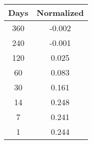 \begin{tabular}{||c c||}
\hline
Days & Normalized \\
\hline\hline
360 & -0.002 \\
240 & -0.001 \\
120 & 0.025 \\
60 & 0.083 \\
30 & 0.161 \\
14 & 0.248 \\
7 & 0.241 \\
1 & 0.244 \\
\hline
\end{tabular}
